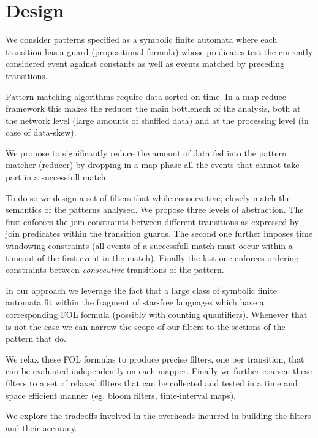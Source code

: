 \section{Design}

We consider patterns specified as a symbolic finite automata where each
transition has a guard (propositional formula) whose predicates test the
currently considered event against constants as well as events matched by
preceding transitions.
   
Pattern matching algorithms require data sorted on time.
In a map-reduce framework this makes the reducer the main bottleneck of the
analysis, both at the network level (large amounts of shuffled data) and at
the processing level (in case of data-skew).



We propose to significantly reduce the amount of data fed into the pattern
matcher (reducer) by dropping in a map phase all the events that cannot take
part in a successfull match.

To do so we design a set of filters that while conservative, closely match the
semantics of the patterns analysed.
We propose three levels of abstraction.
The first enforces the join constraints between different transitions as
expressed by join predicates within the transition guards.
The second one further imposes time windowing constraints (all events of a
successfull match must occur within a timeout of the first event in the match).
Finally the last one enforces ordering constraints between {\em consecutive}
transitions of the pattern.

In our approach we leverage the fact that a large class of symbolic finite
automata fit within the fragment of star-free languages which
have a corresponding FOL formula (possibly with counting quantifiers).
Whenever that is not the case we can narrow the scope of our filters to the
sections of the pattern that do.
 
We relax these FOL formulas to produce precise filters, one per transition, 
that can be evaluated independently on each mapper.
Finally we further coarsen these filters to a set of relaxed filters
that can be collected and tested in a time and space efficient manner (eg. bloom
filters, time-interval maps).

We explore the tradeoffs involved in the overheads incurred in building the
filters and their accuracy. 



